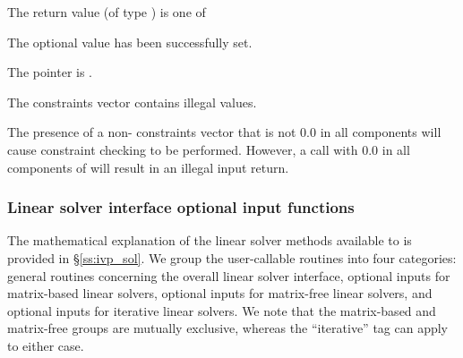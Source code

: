 {{\begin{args}
\begin{itemize}
    \end{itemize}
  \end{args}
}
{
  The return value  (of type ) is one of
  \begin{args}
  \item[\Id{IDA\_SUCCESS}]
    The optional value has been successfully set.
  \item[\Id{IDA\_MEM\_NULL}]
    The  pointer is .
  \item[\Id{IDA\_ILL\_INPUT}]
    The constraints vector contains illegal values.
  \end{args}
}
{
  The presence of a non- constraints vector that is not $0.0$ in
  all components will cause constraint checking to be performed.
  However, a call with $0.0$ in all components of  will
  result in an illegal input return.
}

\subsubsection{Linear solver interface optional input functions}
\label{sss:optin_ls}

The mathematical explanation of the linear solver methods
available to {\ida} is provided in \S\ref{ss:ivp_sol}.  We
group the user-callable routines into four categories: general
routines concerning the overall {\idals} linear solver interface,
optional inputs for matrix-based linear solvers, optional inputs for
matrix-free linear solvers, and optional inputs for iterative linear
solvers.  We note that the matrix-based and matrix-free groups are
mutually exclusive, whereas the ``iterative'' tag can apply to either
case.

}
